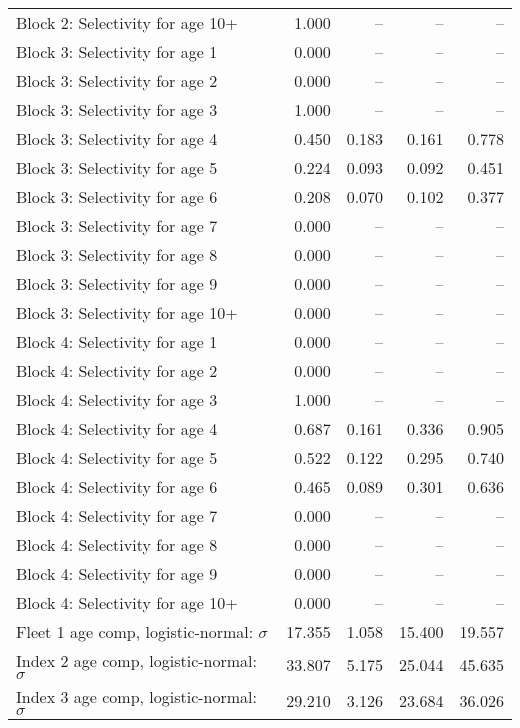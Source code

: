 \documentclass[
]{article}
\begin{document}
\begin{landscape}
\begin{longtable}[t]{lrrrr}
Block 2: Selectivity for age 10+ & 1.000 & -- & -- & --\\
Block 3: Selectivity for age 1 & 0.000 & -- & -- & --\\
Block 3: Selectivity for age 2 & 0.000 & -- & -- & --\\
Block 3: Selectivity for age 3 & 1.000 & -- & -- & --\\
\addlinespace
Block 3: Selectivity for age 4 & 0.450 & 0.183 & 0.161 & 0.778\\
Block 3: Selectivity for age 5 & 0.224 & 0.093 & 0.092 & 0.451\\
Block 3: Selectivity for age 6 & 0.208 & 0.070 & 0.102 & 0.377\\
Block 3: Selectivity for age 7 & 0.000 & -- & -- & --\\
Block 3: Selectivity for age 8 & 0.000 & -- & -- & --\\
\addlinespace
Block 3: Selectivity for age 9 & 0.000 & -- & -- & --\\
Block 3: Selectivity for age 10+ & 0.000 & -- & -- & --\\
Block 4: Selectivity for age 1 & 0.000 & -- & -- & --\\
Block 4: Selectivity for age 2 & 0.000 & -- & -- & --\\
Block 4: Selectivity for age 3 & 1.000 & -- & -- & --\\
\addlinespace
Block 4: Selectivity for age 4 & 0.687 & 0.161 & 0.336 & 0.905\\
Block 4: Selectivity for age 5 & 0.522 & 0.122 & 0.295 & 0.740\\
Block 4: Selectivity for age 6 & 0.465 & 0.089 & 0.301 & 0.636\\
Block 4: Selectivity for age 7 & 0.000 & -- & -- & --\\
Block 4: Selectivity for age 8 & 0.000 & -- & -- & --\\
\addlinespace
Block 4: Selectivity for age 9 & 0.000 & -- & -- & --\\
Block 4: Selectivity for age 10+ & 0.000 & -- & -- & --\\
Fleet 1 age comp, logistic-normal: $\sigma$ & 17.355 & 1.058 & 15.400 & 19.557\\
Index 2 age comp, logistic-normal: $\sigma$ & 33.807 & 5.175 & 25.044 & 45.635\\
Index 3 age comp, logistic-normal: $\sigma$ & 29.210 & 3.126 & 23.684 & 36.026\\*
\end{longtable}
\end{landscape}
\end{document}
